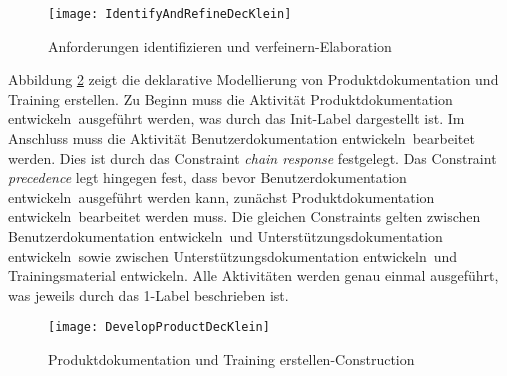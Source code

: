 \begin{figure}[h]
\begin{center}
  \texttt{[image: IdentifyAndRefineDecKlein]} %
  \caption{Anforderungen identifizieren und verfeinern-Elaboration}
  \label{fig:IdentifyAndRefineDecKlein}
\end{center}
\end{figure}



Abbildung \ref{fig:DevelopProductDecKlein} zeigt die deklarative Modellierung von \grqq Produktdokumentation und Training erstellen\grqq.
Zu Beginn muss die Aktivität \grqq Produktdokumentation entwickeln\grqq \ ausgeführt werden, was durch das Init-Label dargestellt ist. Im Anschluss muss die Aktivität \grqq Benutzerdokumentation entwickeln\grqq \ bearbeitet werden. Dies ist durch das Constraint \textit{chain response} festgelegt. Das Constraint \textit{precedence} legt hingegen fest, dass bevor \grqq Benutzerdokumentation entwickeln\grqq \ ausgeführt werden kann, zunächst \grqq Produktdokumentation entwickeln\grqq \ bearbeitet werden muss. Die gleichen Constraints gelten zwischen \grqq Benutzerdokumentation entwickeln\grqq \ und \grqq Unterstützungsdokumentation entwickeln\grqq \ sowie zwischen \grqq Unterstützungsdokumentation entwickeln\grqq \ und \grqq Trainingsmaterial entwickeln\grqq. Alle Aktivitäten werden genau einmal ausgeführt, was jeweils durch das 1-Label beschrieben ist. 

\begin{figure}[htp]
\begin{center}
  \texttt{[image: DevelopProductDecKlein]} %
  \caption{Produktdokumentation und Training erstellen-Construction}
  \label{fig:DevelopProductDecKlein}
\end{center}
\end{figure}


